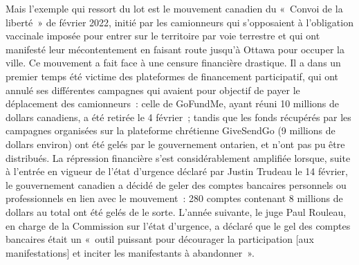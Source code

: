 Mais l'exemple qui ressort du lot est le mouvement canadien du «~Convoi de la liberté~» de février 2022, initié par les camionneurs qui s'opposaient à l'obligation vaccinale imposée pour entrer sur le territoire par voie terrestre et qui ont manifesté leur mécontentement en faisant route jusqu'à Ottawa pour occuper la ville. Ce mouvement a fait face à une censure financière drastique. Il a dans un premier temps été victime des plateformes de financement participatif, qui ont annulé ses différentes campagnes qui avaient pour objectif de payer le déplacement des camionneurs~: celle de GoFundMe, ayant réuni 10 millions de dollars canadiens, a été retirée le 4 février~; tandis que les fonds récupérés par les campagnes organisées sur la plateforme chrétienne GiveSendGo (9 millions de dollars environ) ont été gelés par le gouvernement ontarien, et n'ont pas pu être distribués. La répression financière s'est considérablement amplifiée lorsque, suite à l'entrée en vigueur de l'état d'urgence déclaré par Justin Trudeau le 14 février, le gouvernement canadien a décidé de geler des comptes bancaires personnels ou professionnels en lien avec le mouvement~: 280 comptes contenant 8 millions de dollars au total ont été gelés de le sorte. L'année suivante, le juge Paul Rouleau, en charge de la Commission sur l'état d'urgence, a déclaré que le gel des comptes bancaires était un «~outil puissant pour décourager la participation [aux manifestations] et inciter les manifestants à abandonner~». %

